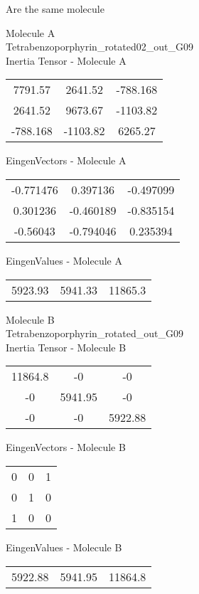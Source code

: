 \begin{center}
\vtab
\vtab
\textcolor{NavyBlue}{\Large Are the same molecule}
\end{center}
\newpage
\begin{multicols}{2}
\begin{center}
Molecule A \\ 
Tetrabenzoporphyrin\_rotated02\_out\_G09
\\
Inertia Tensor - Molecule A \\
\vtab
\begin{tabular}{|c c c|}
7791.57	 & 	2641.52	 & 	-788.168	 \\
2641.52	 & 	9673.67	 & 	-1103.82	 \\
-788.168	 & 	-1103.82	 & 	6265.27
\end{tabular}

\vtab
 EingenVectors - Molecule A     \\
\vtab
\begin{tabular}{|c c c|}
-0.771476	 & 	0.397136	 & 	-0.497099	 \\
0.301236	 & 	-0.460189	 & 	-0.835154	 \\
-0.56043	 & 	-0.794046	 & 	0.235394
\end{tabular}

\vtab
 EingenValues - Molecule A     \\
\vtab
\begin{tabular}{|c c c|}
5923.93	 & 	5941.33	 & 	11865.3
\end{tabular}
\columnbreak

Molecule B \\ 
Tetrabenzoporphyrin\_rotated\_out\_G09
\\
Inertia Tensor - Molecule B \\
\vtab
\begin{tabular}{|c c c|}
11864.8	 & 	-0	 & 	-0	 \\
-0	 & 	5941.95	 & 	-0	 \\
-0	 & 	-0	 & 	5922.88
\end{tabular}

\vtab
 EingenVectors - Molecule B     \\
\vtab
\begin{tabular}{|c c c|}
0	 & 	0	 & 	1	 \\
0	 & 	1	 & 	0	 \\
1	 & 	0	 & 	0
\end{tabular}

\vtab
 EingenValues - Molecule B     \\
\vtab
\begin{tabular}{|c c c|}
5922.88	 & 	5941.95	 & 	11864.8
\end{tabular}

\end{center}
\end{multicols}
